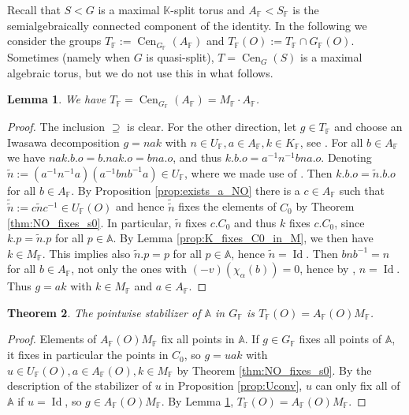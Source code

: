 \documentclass[12pt]{amsart}
\newcommand{\F}{\mathbb{F} }
\newcommand{\K}{\mathbb{K}}
\newcommand{\A}{\mathbb{A}}
\newcommand{\Id}{\operatorname{Id} }
\numberwithin{equation}{section}
\newtheorem{theorem}{Theorem}[section]
\newtheorem{lemma}[theorem]{Lemma}
\theoremstyle{remark} %
\begin{document}
Recall that $S <G$ is a maximal $\K$-split torus and $A_\F < S_\F$ is the semialgebraically connected component of the identity. In the following we consider the groups $T_\F := \operatorname{Cen}_{G_\F}(A_\F)$ and $T_\F(O) := T_\F \cap G_\F(O) $. Sometimes (namely when $G$ is quasi-split), $T = \operatorname{Cen}_{G}(S)$ is a maximal algebraic torus, but we do not use this in what follows. 
\begin{lemma}\label{lem:BT_T_is_MA}
	We have $T_\F = \operatorname{Cen}_{G_\F}(A_\F) = M_\F \cdot A_\F$. %
\end{lemma}
\begin{proof}
	The inclusion $\supseteq$ is clear. For the other direction, let $g \in T_\F$ and choose an Iwasawa decomposition $g = nak$ with $n \in U_\F , a\in A_\F, k \in K_\F$, see \cite[Theorem \ref{I-thm:KAU}]{AppAGRCF}. For all $b \in A_\F$ we have $nak.b.o = b.nak.o = bna.o$, and thus $k.b.o = a^{-1}n^{-1}bna.o$. Denoting $\tilde{n} := (a^{-1}n^{-1}a)(a^{-1}bnb^{-1}a) \in U_\F$, where we made use of \cite[Proposition \ref{I-prop:anainN}]{AppAGRCF}. Then $k.b.o = \tilde{n}.b.o$ for all $b \in A_\F$. By Proposition \ref{prop:exists_a_NO} there is a $c\in A_\F$ such that $\tilde{\tilde{n}} := c\tilde{n}c^{-1} \in U_\F(O)$ and hence $\tilde{\tilde{n}}$ fixes the elements of $C_0$ by Theorem \ref{thm:NO_fixes_s0}. In particular, $\tilde{n}$ fixes $c.C_0$ and thus $k$ fixes $c.C_0$, since $k.p = \tilde{n}.p$ for all $p \in \A$. By Lemma \ref{prop:K_fixes_C0_in_M}, we then have $k \in M_\F$. This implies also $\tilde{n}.p=p$ for all $p\in \A$, hence $\tilde{n} = \operatorname{Id}$. Then $bnb^{-1} =n$ for all $b\in A_\F$, not only the ones with $(-v)(\chi_\alpha(b)) = 0$, hence by \cite[Lemma \ref{I-lem:aexpXa}]{AppAGRCF}, $n= \operatorname{Id}$. Thus $g = ak$ with $k \in M_\F$ and $a \in A_\F$.
\end{proof}

\begin{theorem}\label{thm:stab_A}
	The pointwise stabilizer of $\A$ in $G_\F$ is $T_\F(O) = A_\F(O)M_\F$.
\end{theorem}
\begin{proof}
	Elements of $A_\F(O)M_\F$ fix all points in $\A$. If $g\in G_\F$ fixes all points of $\A$, it fixes in particular the points in $C_0$, so $g = uak$ with $u \in U_\F(O), a \in A_\F(O), k \in M_\F$ by Theorem \ref{thm:NO_fixes_s0}. By the description of the stabilizer of $u$ in Proposition \ref{prop:Uconv}, $u$ can only fix all of $\A$ if $u=\Id$, so $g \in A_\F(O)M_\F$. By Lemma \ref{lem:BT_T_is_MA}, $T_\F(O) = A_\F(O)M_\F$.
\end{proof} 
\end{document}
